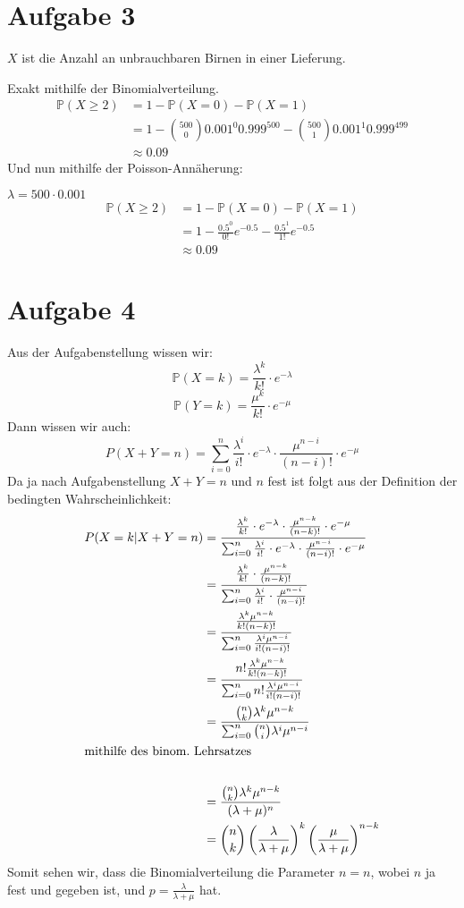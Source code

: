 \documentclass[10pt,a4paper,parskip=half]{scrartcl}
\begin{document}
\section*{Aufgabe 3}
$X$ ist die Anzahl an unbrauchbaren Birnen in einer Lieferung.

Exakt mithilfe der Binomialverteilung.
\begin{align*}
\mathbb P(X \ge 2) &= 1 - \mathbb P(X = 0) - \mathbb P(X = 1)\\
&= 1 - {500 \choose 0 } 0.001^0 0.999^500 - {500 \choose 1 } 0.001^1 0.999^499\\
&\approx 0.09
\end{align*}
Und nun mithilfe der Poisson-Annäherung:

$\lambda = 500 \cdot 0.001$
\begin{align*}
\mathbb P(X \ge 2) &= 1 - \mathbb P(X = 0) - \mathbb P(X = 1)\\
&= 1 - \frac{0.5^0}{0!}e^{-0.5} - \frac{0.5^1}{1!}e^{-0.5}\\
& \approx 0.09
\end{align*}
\section*{Aufgabe 4}
Aus der Aufgabenstellung wissen wir:
$$\mathbb P(X=k) = \frac{\lambda^k}{k!}\cdot e^{-\lambda}$$
$$\mathbb P(Y=k) = \frac{\mu^k}{k!}\cdot e^{-\mu}$$
Dann wissen wir auch:
$$P(X+Y=n) = \sum^n_{i=0} \frac{\lambda^i}{i!}\cdot e^{-\lambda} \cdot\frac{\mu^{n-i}}{(n-i)!}\cdot e^{-\mu}$$
Da ja nach Aufgabenstellung $X+Y=n$ und $n$ fest ist folgt aus der Definition der bedingten Wahrscheinlichkeit:
\begin{align*}P(X=k|X+Y=n) &= \frac{\frac{\lambda^k}{k!}\cdot e^{-\lambda} \cdot\frac{\mu^{n-k}}{(n-k)!} \cdot e^{-\mu}}{\sum^n_{i=0} \frac{\lambda^i}{i!}\cdot e^{-\lambda} \cdot\frac{\mu^{n-i}}{(n-i)!}\cdot e^{-\mu}}\\
&=\frac{\frac{\lambda^k}{k!} \cdot\frac{\mu^{n-k}}{(n-k)!}}{\sum^n_{i=0} \frac{\lambda^i}{i!} \cdot\frac{\mu^{n-i}}{(n-i)!}}\\
&=\frac{\frac{\lambda^k\mu^{n-k}}{k!(n-k)!}}{\sum^n_{i=0} \frac{\lambda^i\mu^{n-i}}{i!(n-i)!}}\\
&=\frac{n!\frac{\lambda^k\mu^{n-k}}{k!(n-k)!}}{\sum^n_{i=0} n!\frac{\lambda^i\mu^{n-i}}{i!(n-i)!}}\\
&=\frac{{n\choose k} \lambda^k\mu^{n-k}}{\sum^n_{i=0} {n\choose i} \lambda^i\mu^{n-i}}\\
\intertext{mithilfe des binom.~Lehrsatzes}\\
&=\frac{{n\choose k} \lambda^k\mu^{n-k}}{(\lambda + \mu)^n}\\
&={n\choose k}\left(\frac{\lambda}{\lambda + \mu}\right)^k\left(\frac{\mu}{\lambda + \mu}\right)^{n-k}\\
\end{align*}
Somit sehen wir, dass die Binomialverteilung die Parameter $n=n$, wobei $n$ ja fest und gegeben ist, und $p=\frac \lambda {\lambda+\mu}$ hat.
\end{document}
